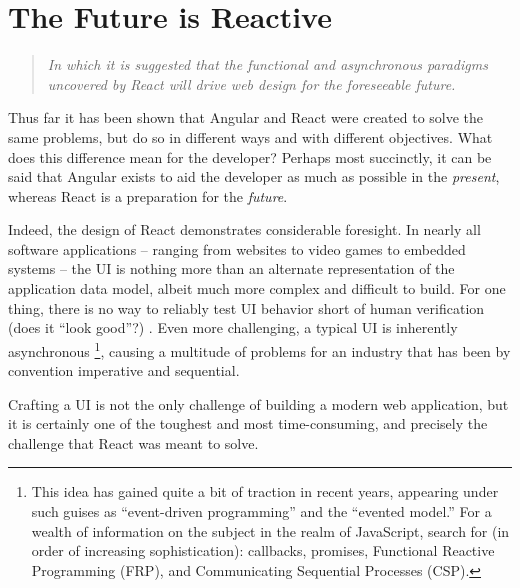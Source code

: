 \documentclass[12pt,letterpaper]{article}
\begin{document}
\section{The Future is Reactive}
\vspace{-12pt}

\begin{quote}
	\singlespacing
	\emph{In which it is suggested that the functional and asynchronous paradigms uncovered by React will drive web design for the foreseeable future.}
\end{quote}

Thus far it has been shown that Angular and React were created to solve the same problems, but do so in different ways and with different objectives. What does this difference mean for the developer? Perhaps most succinctly, it can be said that Angular exists to aid the developer as much as possible in the \emph{present}, whereas React is a preparation for the \emph{future}.

Indeed, the design of React demonstrates considerable foresight. In nearly all software applications -- ranging from websites to video games to embedded systems -- the UI is nothing more than an alternate representation of the application data model, albeit much more complex and difficult to build. For one thing, there is no way to reliably test UI behavior short of human verification (does it ``look good''?) \cite{Hunt:2014}. Even more challenging, a typical UI is inherently asynchronous \footnote{This idea has gained quite a bit of traction in recent years, appearing under such guises as ``event-driven programming'' and the ``evented model.'' For a wealth of information on the subject in the realm of JavaScript, search for (in order of increasing sophistication): callbacks, promises, Functional Reactive Programming (FRP), and Communicating Sequential Processes (CSP).}, causing a multitude of problems for an industry that has been by convention imperative and sequential.




Crafting a UI is not the only challenge of building a modern web application, but it is certainly one of the toughest and most time-consuming, and precisely the challenge that React was meant to solve.










\end{document}
